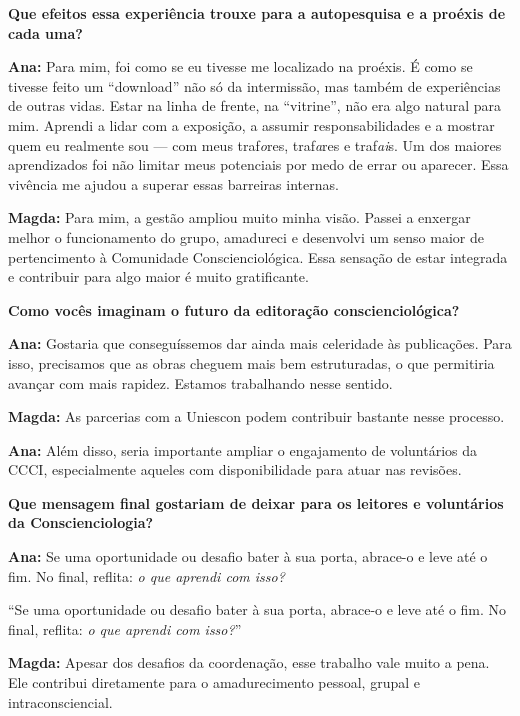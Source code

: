\documentclass{gescons}
\begin{document}
\begin{multicols}{2}
\textbf{Que efeitos essa experiência trouxe para a autopesquisa e a proéxis de cada uma?}

\textbf{Ana:} Para mim, foi como se eu tivesse me localizado na proéxis. É como se tivesse feito um ``download'' não só da intermissão, mas também de experiências de outras vidas. Estar na linha de frente, na ``vitrine'', não era algo natural para mim. Aprendi a lidar com a exposição, a assumir responsabilidades e a mostrar quem eu realmente sou --- com meus traf\emph{o}res, traf\emph{a}res e traf\emph{ai}s. Um dos maiores aprendizados foi não limitar meus potenciais por medo de errar ou aparecer. Essa vivência me ajudou a superar essas barreiras internas.

\textbf{Magda:} Para mim, a gestão ampliou muito minha visão. Passei a enxergar melhor o funcionamento do grupo, amadureci e desenvolvi um senso maior de pertencimento à Comunidade Conscienciológica. Essa sensação de estar integrada e contribuir para algo maior é muito gratificante.

\textbf{Como vocês imaginam o futuro da editoração conscienciológica?}

\textbf{Ana:} Gostaria que conseguíssemos dar ainda mais celeridade às publicações. Para isso, precisamos que as obras cheguem mais bem estruturadas, o que permitiria avançar com mais rapidez. Estamos trabalhando nesse sentido.

\textbf{Magda:} As parcerias com a Uniescon podem contribuir bastante nesse processo.

\textbf{Ana:} Além disso, seria importante ampliar o engajamento de voluntários da CCCI, especialmente aqueles com disponibilidade para atuar nas revisões.

\textbf{Que mensagem final gostariam de deixar para os leitores e voluntários da Conscienciologia?}

\textbf{Ana:} Se uma oportunidade ou desafio bater à sua porta, abrace-o e leve até o fim. No final, reflita: \emph{o que aprendi com isso?}

\begin{pullquote}
``Se uma oportunidade ou desafio bater à sua porta, abrace-o e leve até o fim. No final, reflita: \emph{o que aprendi com isso?}''
\end{pullquote}

\textbf{Magda:} Apesar dos desafios da coordenação, esse trabalho vale muito a pena. Ele contribui diretamente para o amadurecimento pessoal, grupal e intraconsciencial.



\end{multicols}
\end{document}
